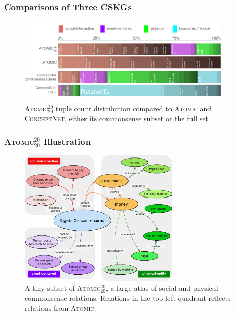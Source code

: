 \documentclass[10pt,aspectratio=43]{beamer}
\newcommand\atomic{\textsc{Atomic}\xspace}
\newcommand\atomicTT{\textsc{Atomic$^{20}_{20}$}\xspace}
\newcommand\conceptnet{\textsc{ConceptNet}\xspace}
\begin{document}
    \begin{frame}
        \frametitle{\textbf{Comparisons of Three CSKGs}}
        \begin{figure}
            \centering
            \includegraphics[width=4in]{figures/atomic2020_v3.pdf}
            \caption{\atomicTT{} tuple count distribution compared to \atomic and \conceptnet, either its commonsense subset or the full set.}
            \label{fig:tuple_distribution}
        \end{figure}
    \end{frame}   
    
    \begin{frame}
        \frametitle{\textbf{\atomicTT{} Illustration}}
        \begin{figure}
            \centering
            \includegraphics[width=3in]{figures/atomic2020_fig1.pdf}
            \caption{A tiny subset of \atomicTT{}, a large atlas of social and physical commonsense relations. Relations in the top-left quadrant reflects relations from \atomic{}.}
            \label{fig:large_example}
        \end{figure}
    \end{frame}
    
\end{document}

